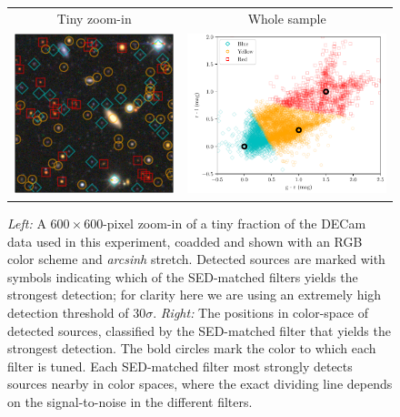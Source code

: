 \documentclass[letterpaper,preprint]{aastex62}
\begin{document}
\begin{figure}
  \begin{center}
    \begin{tabular}{cc}
      Tiny zoom-in & Whole sample \\
      \includegraphics[height=0.4\textwidth]{image-sources-30}
      &
      \includegraphics[height=0.4\textwidth]{best-color-30}
    \end{tabular}
    \caption{\emph{Left:} A $600 \times 600$-pixel zoom-in of a tiny
      fraction of the DECam data used in this experiment, coadded and
      shown with an RGB color scheme and \emph{arcsinh} stretch.
      Detected sources are marked with symbols indicating which of the
      SED-matched filters yields the strongest detection; for clarity
      here we are using an extremely high detection threshold of $30
      \sigma$.  \emph{Right:}
      The positions in color-space of detected sources, classified by
      the SED-matched filter that yields the strongest detection.  The
      bold circles mark the color to which each filter is tuned.  Each
      SED-matched filter most strongly detects sources nearby in color
      spaces, where the exact dividing line depends on the
      signal-to-noise in the different filters.
      \label{fig:expt}}
  \end{center}
\end{figure}
\end{document}
